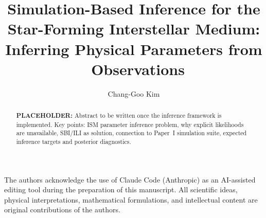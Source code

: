 \documentclass[twocolumn,twocolappendix,linenumbers]{aastex702}
\begin{document}
\title{Simulation-Based Inference for the Star-Forming Interstellar Medium:
       Inferring Physical Parameters from \PHANGS\ Observations}

\author[0000-0003-2896-3725]{Chang-Goo Kim}


\begin{abstract}
\textbf{PLACEHOLDER:} Abstract to be written once the inference framework is
implemented. Key points: ISM parameter inference problem, why explicit likelihoods
are unavailable, SBI/ILI as solution, connection to Paper~I simulation suite,
expected inference targets and posterior diagnostics.
\end{abstract}









\begin{acknowledgments}
The authors acknowledge the use of Claude Code (Anthropic) as an AI-assisted
editing tool during the preparation of this manuscript. All scientific ideas,
physical interpretations, mathematical formulations, and intellectual content
are original contributions of the authors.
\end{acknowledgments}



\end{document}
